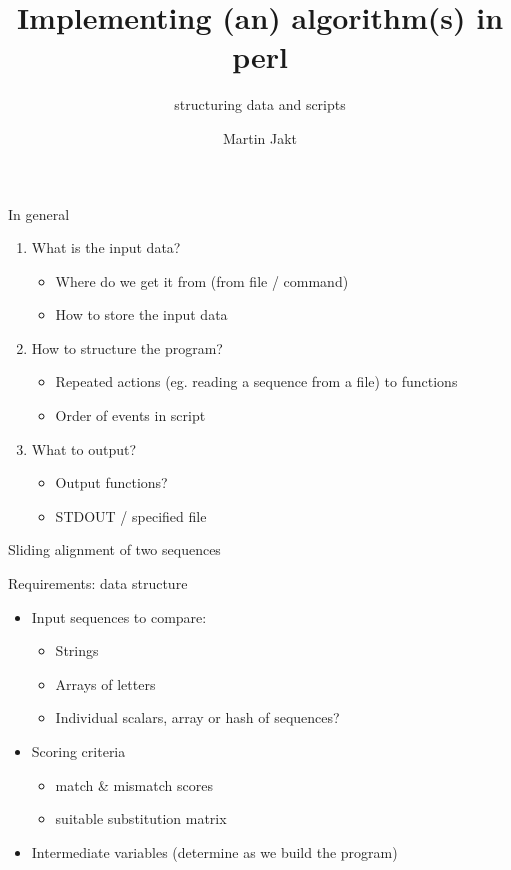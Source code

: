 \documentclass[pdf]{beamer}
\title{Implementing (an) algorithm(s) in perl}
\subtitle{structuring data and scripts}
\author{Martin Jakt}
\begin{document}
\begin{frame}
  \titlepage
\end{frame}

\begin{frame}{In general}
  \begin{enumerate}
  \item What is the input data?
    \begin{itemize}
    \item Where do we get it from (from file / command)
    \item How to store the input data
    \end{itemize}
    \pause
  \item How to structure the program?
    \begin{itemize}
    \item Repeated actions (eg. reading a sequence from a file) to functions
    \item Order of events in script
    \end{itemize}
    \pause
  \item What to output?
    \begin{itemize}
    \item Output functions?
    \item STDOUT / specified file
    \end{itemize}
  \end{enumerate}
\end{frame}

\begin{frame}{Sliding alignment of two sequences}
  \begin{figure}[ht]
    \begin{tikzpicture}[scale=0.5]
      
    \end{tikzpicture}
  \end{figure}
\end{frame}

\begin{frame}{Requirements: data structure}
  \begin{itemize}
  \item Input sequences to compare:
    \begin{itemize}
    \item Strings
    \item Arrays of letters
    \item Individual scalars, array or hash of sequences?
    \end{itemize}
    \pause
  \item Scoring criteria
    \begin{itemize}
    \item match \& mismatch scores
    \item suitable substitution matrix
    \end{itemize}
    \pause
  \item Intermediate variables (determine as we build the program)
  \end{itemize}
\end{frame}
\end{document}
